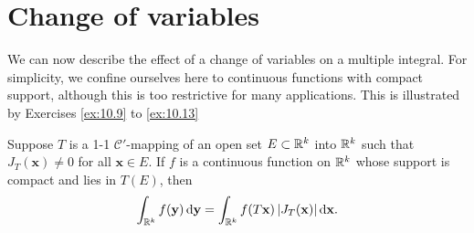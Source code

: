 \section{Change of variables}

We can now describe the effect of a change of variables on a multiple integral.
For simplicity, we confine ourselves here to continuous functions with compact
support, although this is too restrictive for many applications.
This is illustrated by Exercises \ref{ex:10.9} to \ref{ex:10.13}

\begin{thm}
    \label{thm:10.9}
    Suppose $T$ is a 1-1 $\mathscr{C}'$-mapping of an open set $E \subset {\protect\mathbb R}^k$ into ${\protect\mathbb R}^k$
    such that $J_T(\mathbf{x}) \neq 0$ for all $\mathbf{x} \in E$.
    If $f$ is a continuous function on ${\protect\mathbb R}^k$ whose support is compact and lies in $T(E)$, then
    \begin{equation}
        \label{eq:10.31}
        \int_{\R^k} f(\mathbf{y}) \d \mathbf{y} =
        \int_{\R^k} f(T \mathbf{x}) \left| J_T(\mathbf{x}) \right| \d \mathbf{x} .
    \end{equation}
\end{thm}



